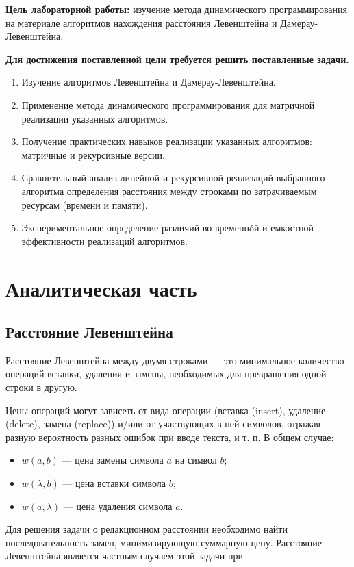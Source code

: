 \documentclass[12pt]{report}
\begin{document}
\textbf{Цель лабораторной работы: } изучение метода динамического программирования на материале алгоритмов нахождения расстояния Левенштейна и Дамерау-Левенштейна.

\textbf{Для достижения поставленной цели требуется решить поставленные задачи.}
\begin{enumerate}
  	\item Изучение алгоритмов Левенштейна и Дамерау-Левенштейна.
	\item Применение метода динамического программирования для матричной реализации указанных алгоритмов.
	\item Получение практических навыков реализации указанных алгоритмов: матричные и рекурсивные версии.
	\item Сравнительный анализ линейной и рекурсивной реализаций выбранного алгоритма определения расстояния между строками по затрачиваемым ресурсам (времени и памяти).
	\item Экспериментальное определение различий во временнóй и емкостной эффективности реализаций алгоритмов.
\end{enumerate}

\chapter{Аналитическая часть}
\section{Расстояние Левенштейна}
Расстояние Левенштейна между двумя строками — это минимальное количество операций вставки, удаления и замены, необходимых для превращения одной строки в другую.


Цены операций могут зависеть от вида операции (вставка (insert), удаление (delete), замена (replace)) и/или от участвующих в ней символов, отражая разную вероятность разных ошибок при вводе текста, и т. п. В общем случае:

\begin{itemize}
	\item $w(a,b)$ — цена замены символа $a$ на символ $b$;
	\item $w(\lambda,b)$ — цена вставки символа $b$;
	\item $w(a,\lambda)$ — цена удаления символа $a$.
\end{itemize}

Для решения задачи о редакционном расстоянии необходимо найти последовательность замен, минимизирующую суммарную цену. Расстояние Левенштейна является частным случаем этой задачи при
\end{document}
